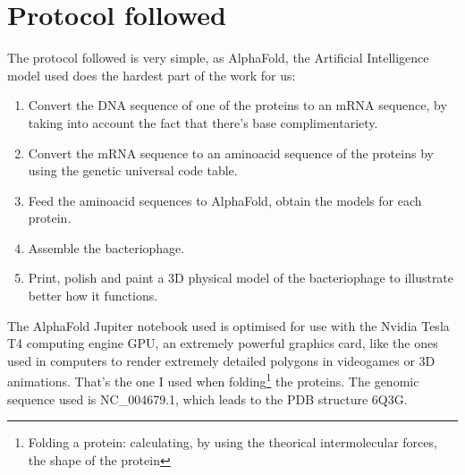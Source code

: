 \section{Protocol followed}
The protocol followed is very simple, as AlphaFold, the Artificial Intelligence model used does the hardest part of the work for us:
\begin{enumerate}[label=\arabic*)]
\item Convert the DNA sequence of one of the proteins to an mRNA sequence, by taking into account the fact that there's base complimentariety.
\item Convert the mRNA sequence to an aminoacid sequence of the proteins by using the genetic universal code table.
\item Feed the aminoacid sequences to AlphaFold, obtain the models for each protein.
\item Assemble the bacteriophage. 
\item Print, polish and paint a 3D physical model of the bacteriophage to illustrate better how it functions.
\end{enumerate}
The AlphaFold Jupiter notebook\cite{GoogleColaboratoryAlpha-} used is optimised for use with the Nvidia Tesla T4 computing engine GPU, an extremely powerful graphics card, like the ones used in computers to render extremely detailed polygons in videogames or 3D animations. That's the one I used when folding\footnote{Folding a protein: calculating, by using the theorical intermolecular forces, the shape of the protein} the proteins. The genomic sequence used is NC\_004679.1, which leads to the PDB structure 6Q3G.
